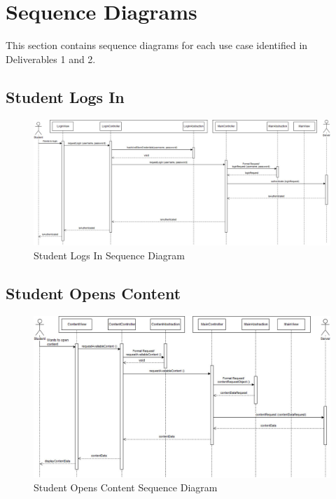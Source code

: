 \documentclass[]{article}
\begin{document}
\section{Sequence Diagrams}
\label{sec:sequence_diagrams}
This section contains sequence diagrams for each use case identified in Deliverables 1 and 2.

\subsection{Student Logs In}
{
\begin{figure}[H]
  \centering
  \includegraphics[scale=0.3]{A3_Assets/StudentLogsIn.jpg}
  \caption{Student Logs In Sequence Diagram}
\end{figure}
}

\subsection{Student Opens Content}
{
\begin{figure}[H]
  \centering
  \includegraphics[scale=0.3]{A3_Assets/StudentOpensContent.jpg}
  \caption{Student Opens Content Sequence Diagram}
\end{figure}
}
\end{document}
